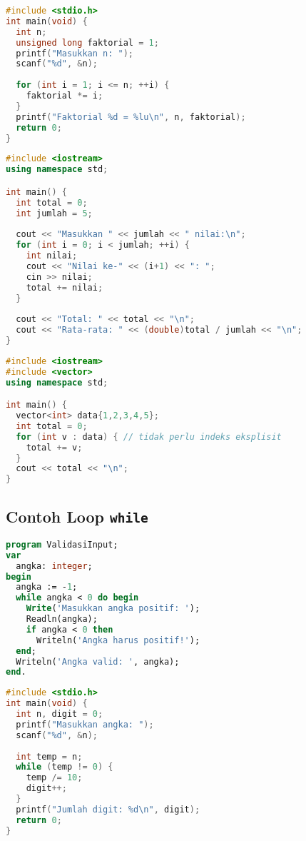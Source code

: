 \documentclass[../main.tex]{subfiles}
\begin{document}
\begin{lstlisting}[language=C, caption={Hitung faktorial dengan for (C)}]
#include <stdio.h>
int main(void) {
  int n;
  unsigned long faktorial = 1;
  printf("Masukkan n: ");
  scanf("%d", &n);
  
  for (int i = 1; i <= n; ++i) {
    faktorial *= i;
  }
  printf("Faktorial %d = %lu\n", n, faktorial);
  return 0;
}
\end{lstlisting}

\begin{lstlisting}[language=C++, caption={Loop for dengan hitung total (C++)}]
#include <iostream>
using namespace std;

int main() {
  int total = 0;
  int jumlah = 5;
  
  cout << "Masukkan " << jumlah << " nilai:\n";
  for (int i = 0; i < jumlah; ++i) {
    int nilai;
    cout << "Nilai ke-" << (i+1) << ": ";
    cin >> nilai;
    total += nilai;
  }
  
  cout << "Total: " << total << "\n";
  cout << "Rata-rata: " << (double)total / jumlah << "\n";
}
\end{lstlisting}

\begin{lstlisting}[language=C++, caption={Range-based for pada koleksi (C++11+)}]
#include <iostream>
#include <vector>
using namespace std;

int main() {
  vector<int> data{1,2,3,4,5};
  int total = 0;
  for (int v : data) { // tidak perlu indeks eksplisit
    total += v;
  }
  cout << total << "\n";
}
\end{lstlisting}

\subsection{Contoh Loop \texttt{while}}
\begin{lstlisting}[language=Pascal, caption={Input validasi dengan while (Pascal)}]
program ValidasiInput;
var
  angka: integer;
begin
  angka := -1;
  while angka < 0 do begin
    Write('Masukkan angka positif: ');
    Readln(angka);
    if angka < 0 then
      Writeln('Angka harus positif!');
  end;
  Writeln('Angka valid: ', angka);
end.
\end{lstlisting}

\begin{lstlisting}[language=C, caption={Hitung digit dengan while (C)}]
#include <stdio.h>
int main(void) {
  int n, digit = 0;
  printf("Masukkan angka: ");
  scanf("%d", &n);
  
  int temp = n;
  while (temp != 0) {
    temp /= 10;
    digit++;
  }
  printf("Jumlah digit: %d\n", digit);
  return 0;
}
\end{lstlisting}
\end{document}

